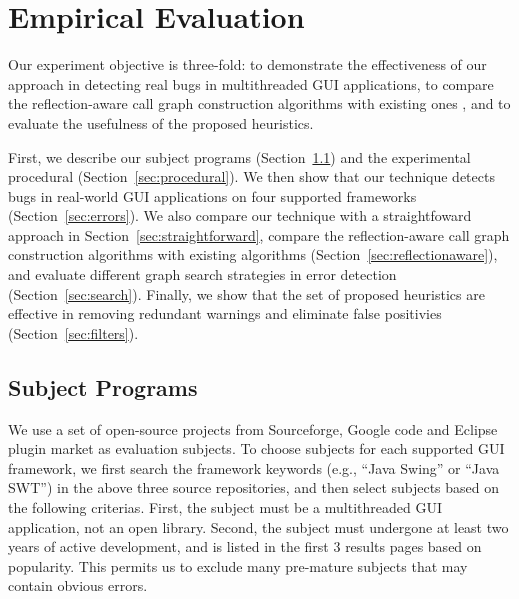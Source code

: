 \section{Empirical Evaluation}
\label{sec:evaluation}





Our experiment objective is three-fold: to demonstrate the effectiveness
of our approach in detecting real bugs in multithreaded GUI applications, to 
compare the reflection-aware call graph construction algorithms
with existing ones , and to evaluate the usefulness of the proposed 
 heuristics.  

First, we describe our subject programs (Section~\ref{sec:subjects}) and the experimental procedural (Section~\ref{sec:procedural}).
We then show that our technique detects bugs in real-world GUI applications on
four supported frameworks (Section~\ref{sec:errors}). We also compare our technique with
a straightfoward approach in Section~\ref{sec:straightforward},  compare the reflection-aware call graph
construction algorithms with existing algorithms (Section~\ref{sec:reflectionaware}), and
evaluate different graph search strategies in error detection (Section~\ref{sec:search}).
 Finally, we show that the set of proposed heuristics are effective
in removing redundant warnings and eliminate false positivies (Section~\ref{sec:filters}). 



\subsection{Subject Programs}
\label{sec:subjects}


We use a set of open-source projects from Sourceforge, Google code and Eclipse plugin
market as evaluation subjects. To choose subjects for each supported GUI framework,
we first search the framework keywords (e.g., ``Java Swing'' or ``Java SWT'')
in the above three source repositories, and then select subjects based on the following
criterias. First, the subject must be a multithreaded GUI application, not
an open library. Second, the subject must undergone at least two years of active development,
and is listed in the first 3 results pages based on popularity. This permits us
to exclude many pre-mature subjects that may contain obvious errors.

